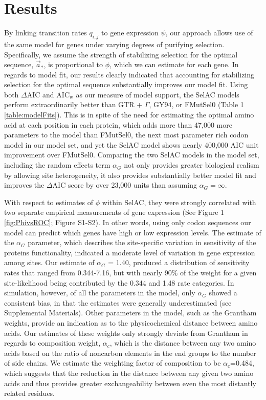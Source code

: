 \documentclass{article}
\newcommand{\DeltaAIC}{\ensuremath{\Delta\text{AIC}}\xspace}
\newcommand{\AICw}{\ensuremath{\text{AIC}_\text{w}}\xspace}
\newcommand{\alphac}{\ensuremath{\alpha_c}\xspace}
\newcommand{\alphag}{\ensuremath{\alpha_G}\xspace}
\newcommand{\aoptvec}{\ensuremath{\Vec{a}_*}\xspace}
\newcommand{\qij}{\ensuremath{q_{i,j}}\xspace}
\begin{document}
\section*{Results}
By linking transition rates $\qij$ to gene expression $\psi$, our approach allows use of the same model for genes under varying degrees of purifying selection.
Specifically, we assume the strength of stabilizing selection for the optimal sequence, \aoptvec, is proportional to $\phi$, which we can estimate for each gene. 
In regards to model fit, our results clearly indicated that accounting for stabilizing selection for the optimal sequence substantially improves our model fit.
Using both \DeltaAIC and \AICw as our measure of model support, the SelAC models perform extraordinarily better than GTR + $\Gamma$, GY94, or FMutSel0 (Table 1 \ref{table:modelFits}).
This is in spite of the need for estimating the optimal amino acid at each position in each protein, which adds more than 47,000 more parameters to the model than FMutSel0, the next most parameter rich codon model in our model set, and yet the SelAC model shows nearly 400,000 AIC unit improvement over FMutSel0.
Comparing the two SelAC models in the model set, including the random effects term $\alphag$ not only provides greater biological realism by allowing site heterogeneity, it also provides substantially better model fit and improves the \DeltaAIC score by over 23,000 units than assuming $\alphag = \infty$. 

With respect to estimates of $\phi$ within SelAC, they were strongly correlated with two separate empirical measurements of gene expression (See Figure 1 \ref{fig:PhivsROC}; Figure S1-S2).
In other words, using only codon sequences our model can predict which genes have high or low expression levels.
The estimate of the $\alphag$ parameter, which describes the site-specific variation in sensitivity of the proteins functionality, indicated a moderate level of variation in gene expression among sites.
Our estimate of $\alphag$ = 1.40, produced a distribution of sensitivity rates that ranged from 0.344-7.16, but with nearly 90\% of the weight for a given site-likelihood being contributed by the 0.344 and 1.48 rate categories.
In simulation, however, of all the parameters in the model, only $\alphag$ showed a consistent bias, in that the estimates were generally underestimated (see Supplemental Materials).
Other parameters in the model, such as the Grantham weights, provide an indication as to the physicochemical distance between amino acids.
Our estimates of these weights only strongly deviate from Grantham in regards to composition weight, $\alphac$, which is the distance between any two amino acids based on the ratio of noncarbon elements in the end groups to the number of side chains.
We estimate the weighting factor of composition to be $\alphac$=0.484, which suggests that the reduction in the distance between any given two amino acids and thus provides greater exchangeability between even the most distantly related residues.
\end{document}
